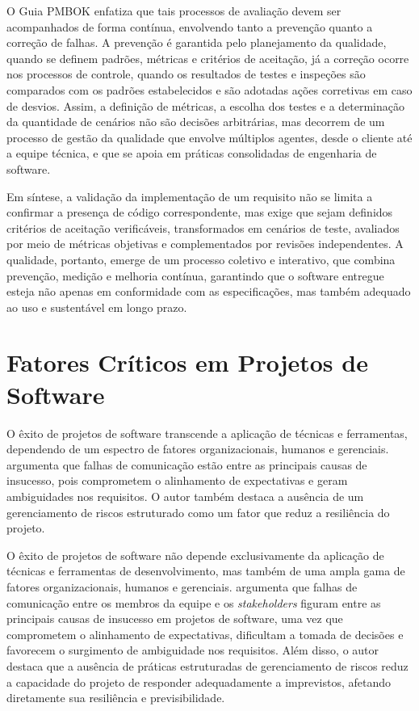 O Guia PMBOK \textit{\cite{pmi2008}} enfatiza que tais processos de avaliação devem ser acompanhados de forma contínua, envolvendo tanto a prevenção quanto a correção de falhas. A prevenção é garantida pelo planejamento da qualidade, quando se definem padrões, métricas e critérios de aceitação, já a correção ocorre nos processos de controle, quando os resultados de testes e inspeções são comparados com os padrões estabelecidos e são adotadas ações corretivas em caso de desvios. Assim, a definição de métricas, a escolha dos testes e a determinação da quantidade de cenários não são decisões arbitrárias, mas decorrem de um processo de gestão da qualidade que envolve múltiplos agentes, desde o cliente até a equipe técnica, e que se apoia em práticas consolidadas de engenharia de software.

Em síntese, a validação da implementação de um requisito não se limita a confirmar a presença de código correspondente, mas exige que sejam definidos critérios de aceitação verificáveis, transformados em cenários de teste, avaliados por meio de métricas objetivas e complementados por revisões independentes. A qualidade, portanto, emerge de um processo coletivo e interativo, que combina prevenção, medição e melhoria contínua, garantindo que o software entregue esteja não apenas em conformidade com as especificações, mas também adequado ao uso e sustentável em longo prazo.

\section{Fatores Críticos em Projetos de Software}

O êxito de projetos de software transcende a aplicação de técnicas e ferramentas, dependendo de um espectro de fatores organizacionais, humanos e gerenciais.  argumenta que falhas de comunicação estão entre as principais causas de insucesso, pois comprometem o alinhamento de expectativas e geram ambiguidades nos requisitos. O autor também destaca a ausência de um gerenciamento de riscos estruturado como um fator que reduz a resiliência do projeto.

O êxito de projetos de software não depende exclusivamente da aplicação de técnicas e ferramentas de desenvolvimento, mas também de uma ampla gama de fatores organizacionais, humanos e gerenciais.  argumenta que falhas de comunicação entre os membros da equipe e os \textit{stakeholders} figuram entre as principais causas de insucesso em projetos de software, uma vez que comprometem o alinhamento de expectativas, dificultam a tomada de decisões e favorecem o surgimento de ambiguidade nos requisitos. Além disso, o autor destaca que a ausência de práticas estruturadas de gerenciamento de riscos reduz a capacidade do projeto de responder adequadamente a imprevistos, afetando diretamente sua resiliência e previsibilidade.

